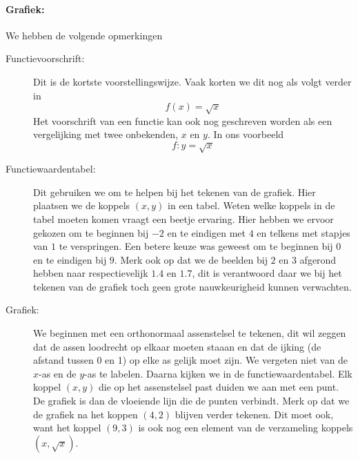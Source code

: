 \documentclass[12pt,twoside]{article}
\begin{document}
\paragraph{Grafiek:}
\begin{center}
\end{center}

We hebben de volgende opmerkingen
\begin{description}
  \item[Functievoorschrift:] Dit is de kortste voorstellingswijze. Vaak korten we dit nog als volgt verder in
  $$f(x)=\sqrt{x}$$
  Het voorschrift van een functie kan ook nog geschreven worden als een vergelijking met twee onbekenden, $x$ en $y$. In ons voorbeeld
  $$f: y=\sqrt{x}$$
  \item[Functiewaardentabel:] Dit gebruiken we om te helpen bij het tekenen van de grafiek. Hier plaatsen we de koppels $(x,y)$ in een tabel. Weten welke koppels in de tabel moeten komen vraagt een beetje ervaring. Hier hebben we ervoor gekozen om te beginnen bij $-2$ en te eindigen met $4$ en telkens met stapjes van $1$ te verspringen. Een betere keuze was geweest om te beginnen bij $0$ en te eindigen bij $9$. Merk ook op dat we de beelden bij $2$ en $3$ afgerond hebben naar respectievelijk $1.4$ en $1.7$, dit is verantwoord daar we bij het tekenen van de grafiek toch geen grote nauwkeurigheid kunnen verwachten.
  \item[Grafiek:] We beginnen met een orthonormaal assenstelsel te tekenen, dit wil zeggen dat de assen loodrecht op elkaar moeten staaan en dat de ijking (de afstand tussen 0 en 1) op elke as gelijk moet zijn. We vergeten niet van de $x$-as en de $y$-as te labelen. Daarna kijken we in de functiewaardentabel. Elk koppel $(x,y)$ die op het assenstelsel past duiden we aan met een punt. De grafiek is dan de vloeiende lijn die de punten verbindt. Merk op dat we de grafiek na het koppen $(4,2)$ blijven verder tekenen. Dit moet ook, want het koppel $(9,3)$ is ook nog een element van de verzameling koppels $(x,\sqrt{x})$.
\end{description}
\end{document}
